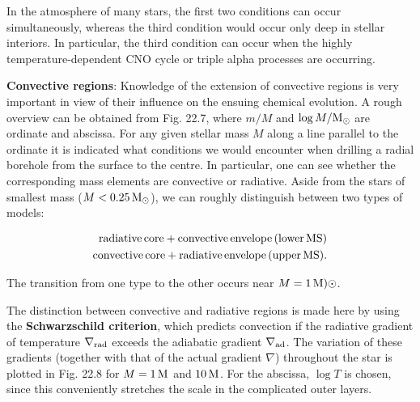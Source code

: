 \documentclass[a4paper,10pt]{article}
\begin{document}
{\noindent}In the atmosphere of many stars, the first two conditions can occur simultaneously, whereas the third condition would occur only deep in stellar interiors. In particular, the third condition can occur when the highly temperature-dependent CNO cycle or triple alpha processes are occurring.

{\noindent}\textbf{Convective regions}: Knowledge of the extension of convective regions is very important in view of their influence on the ensuing chemical evolution. A rough overview can be obtained from Fig. 22.7, where $m/M$ and $\log M/{\rm M_\odot}$ are ordinate and abscissa. For any given stellar mass $M$ along a line parallel to the ordinate it is indicated what conditions we would encounter when drilling a radial borehole from the surface to the centre. In particular, one can see whether the corresponding mass elements are convective or radiative. Aside from the stars of smallest mass ($M<0.25\,{\rm M_\odot}$), we can roughly distinguish between two types of models:

\begin{align*}
    {\rm radiative\,core+convective\,envelope\,(lower\,MS)} \\
    {\rm convective\,core+radiative\,envelope\,(upper\,MS)}.
\end{align*}

{\noindent}The transition from one type to the other occurs near $M=1\,{\rm M)\odot}$.

{\noindent}The distinction between convective and radiative regions is made here by using the \textbf{Schwarzschild criterion}, which predicts convection if the radiative gradient of temperature $\nabla_{\rm rad}$ exceeds the adiabatic gradient $\nabla_{\rm ad}$. The variation of these gradients (together with that of the actual gradient $\nabla$) throughout the star is plotted in Fig. 22.8 for $M=1\,{\rm M}$ and $10\,{\rm M}$. For the abscissa, $\log T$ is chosen, since this conveniently stretches the scale in the complicated outer layers.
\end{document}
